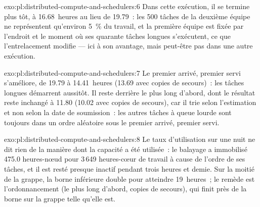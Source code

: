 \begin{solution}{exo:pl:distributed-compute-and-schedulers:6}
Dans cette exécution, il se termine plus tôt, à 16.68~heures au lieu de 19.79~: les 500 tâches de la deuxième équipe ne représentent qu'environ 5~\% du travail, et la première
équipe est fixée par l'endroit et le moment où ses quarante tâches longues s'exécutent, ce que l'entrelacement modifie --- ici à son avantage, mais
peut-être pas dans une autre exécution.
\end{solution}

\begin{solution}{exo:pl:distributed-compute-and-schedulers:7}
Le premier arrivé, premier servi s'améliore, de 19.79 à 14.41~heures (13.69 avec copies de secours)~: les tâches longues démarrent aussitôt. Il reste derrière le plus long d'abord,
dont le résultat reste inchangé à 11.80 (10.02 avec copies de secours), car il trie selon l'estimation et non selon la date de soumission~: les autres tâches à queue lourde sont toujours dans
un ordre aléatoire sous le premier arrivé, premier servi.
\end{solution}

\begin{solution}{exo:pl:distributed-compute-and-schedulers:8}
Le taux d'utilisation sur une nuit ne dit rien de la manière dont la capacité a été utilisée~: le balayage a immobilisé 475.0 heures-nœud pour 3\,649 heures-cœur de travail à cause de
l'ordre de ses tâches, et il est resté presque inactif pendant trois heures et demie. Sur la moitié de la grappe, la borne inférieure double pour atteindre 19~heures~; le remède est
l'ordonnancement (le plus long d'abord, copies de secours), qui finit près de la borne sur la grappe telle qu'elle est.
\end{solution}


